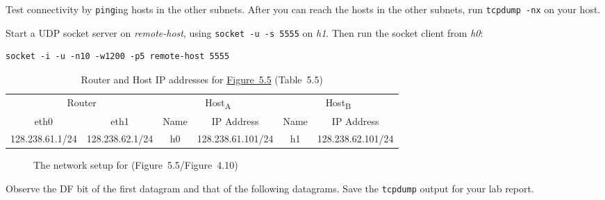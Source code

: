 \documentclass{../UTNetLab}
\begin{document}
    Test connectivity by \lstinline{ping}ing hosts in the other subnets.
    After you can reach the
    hosts in the other subnets, run \lstinline{tcpdump -nx} on your host.

    Start a UDP socket server on \textit{remote-host}, using \lstinline{socket -u -s 5555} on \textit{h1}.
    Then run the socket client from \textit{h0}:
    \begin{lstlisting}[emph={remote-host}]
socket -i -u -n10 -w1200 -p5 remote-host 5555
    \end{lstlisting}

    \begin{table}[H]
        \caption{Router and Host IP addresses for \hyperref[fig:5.5]{Figure~5.5} (Table~5.5)}
        \centering
        \begin{tabular}{ *2c|*2c|*2c }
            \hline \hline
            \multicolumn{2}{c|}{Router} & \multicolumn{2}{c|}{Host\textsubscript{A}} & \multicolumn{2}{c}{Host\textsubscript{B}} \\
            eth0 & eth1 & Name & IP Address & Name & IP Address \\
            \hline 
            128.238.61.1/24 & 128.238.62.1/24 & h0 & 128.238.61.101/24 & h1 & 128.238.62.101/24 \\
            \hline \hline
            \end{tabular}
    \end{table}

    \begin{figure}[H]
        \centering
        \caption{The network setup for  (Figure~5.5/Figure~4.10)}
        \label{fig:5.5}
    \end{figure}

    Observe the DF bit of the first datagram and that of the following datagrams.
    Save the \lstinline{tcpdump} output for your lab report.
\end{document}
